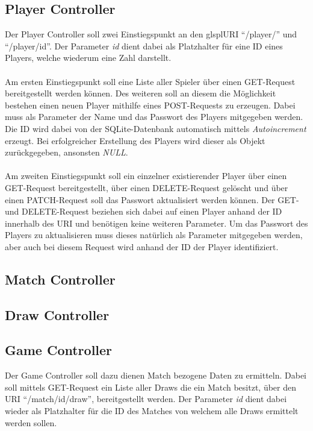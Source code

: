 \subsection{Player Controller}\label{sec:playerController}
Der Player Controller soll zwei Einstiegspunkt an den glspl{URI} \enquote{/player/} und \enquote{/player/{id}}. Der Parameter \textit{{id}} dient dabei als Platzhalter für eine ID eines Players, welche wiederum eine Zahl darstellt.\\
\\
Am ersten Einstiegspunkt soll eine Liste aller Spieler über einen GET-Request bereitgestellt werden können. Des weiteren soll an diesem die Möglichkeit bestehen einen neuen Player mithilfe eines POST-Requests zu erzeugen. Dabei muss als Parameter der Name und das Passwort des Players mitgegeben werden. Die ID wird dabei von der SQLite-Datenbank automatisch mittels \textit{Autoincrement} erzeugt. Bei erfolgreicher Erstellung des Players wird dieser als Objekt zurückgegeben, ansonsten \textit{NULL}.\\
\\
Am zweiten Einstiegspunkt soll ein einzelner existierender Player über einen GET-Request bereitgestellt, über einen DELETE-Request gelöscht und über einen PATCH-Request soll das Passwort aktualisiert werden können. Der GET- und DELETE-Request beziehen sich dabei auf einen Player anhand der ID innerhalb des \gls{URI} und benötigen keine weiteren Parameter. Um das Passwort des Players zu aktualisieren muss dieses natürlich als Parameter mitgegeben werden, aber auch bei diesem Request wird anhand der ID der Player identifiziert.

\subsection{Match Controller}\label{sec:matchController}


\subsection{Draw Controller}\label{sec:drawController}


\subsection{Game Controller}\label{sec:gameController}
Der Game Controller soll dazu dienen Match bezogene Daten zu ermitteln. Dabei soll mittels GET-Request ein Liste aller Draws die ein Match besitzt, über den \gls{URI} \enquote{/match/{id}/draw}, bereitgestellt werden. Der Parameter \textit{{id}} dient dabei wieder als Platzhalter für die ID des Matches von welchem alle Draws ermittelt werden sollen.

